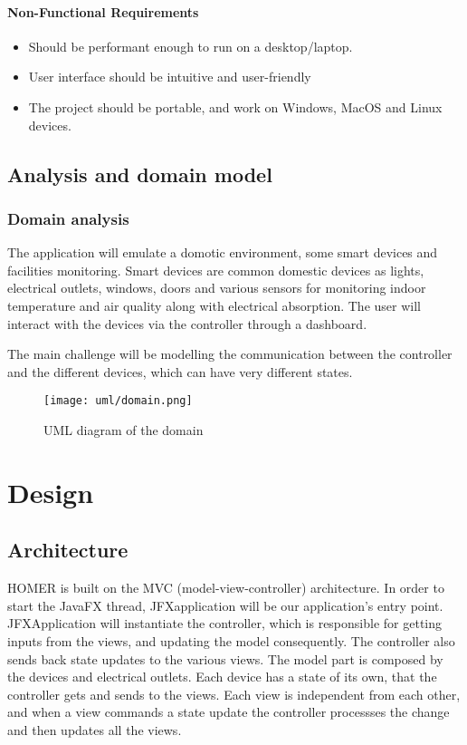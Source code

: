 \documentclass[a4paper,12pt]{report}
\begin{document}
\subsubsection{Non-Functional Requirements}

\begin{itemize}
	\item Should be performant enough to run on a desktop/laptop.
	\item User interface should be intuitive and user-friendly
	\item The project should be portable, and work on Windows, MacOS and Linux devices.
\end{itemize}

\section{Analysis and domain model}
\subsection[]{Domain analysis}

The application will emulate a domotic environment, some smart devices and facilities monitoring.
Smart devices are common domestic devices as lights, electrical outlets, windows, doors and various sensors 
for monitoring indoor temperature and air quality along with electrical absorption.
The user will interact with the devices via the controller through a dashboard.

The main challenge will be modelling the communication between the controller 
and the different devices, which can have very different states.

\begin{figure}[H]
\centering{}
\texttt{[image: uml/domain.png]}
\caption{UML diagram of the domain}
\label{uml:domain}
\end{figure}

\chapter{Design}
\section{Architecture}

HOMER is built on the MVC (model-view-controller) architecture. 
In order to start the JavaFX thread, JFXapplication will be our application's entry point.
JFXApplication will instantiate the controller, which is responsible for getting inputs from the views,
and updating the model consequently. The controller also sends back state updates to the various views.
The model part is composed by the devices and electrical outlets. Each device has a state of its own, that
the controller gets and sends to the views. 
Each view is independent from each other, and when a view commands a state update
the controller processses the change and then updates all the views.
\end{document}
